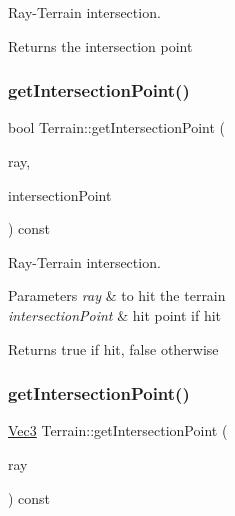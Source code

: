 Ray-\/\+Terrain intersection. \begin{DoxyReturn}{Returns}
the intersection point 
\end{DoxyReturn}
\mbox{\label{classTerrain_a1455fb66bddeae92b522ce4523ed42f7}} 
\subsubsection{\texorpdfstring{get\+Intersection\+Point()}{getIntersectionPoint()}\hspace{0.1cm}{\footnotesize\ttfamily [2/4]}}
{\footnotesize\ttfamily bool Terrain\+::get\+Intersection\+Point (\begin{DoxyParamCaption}\item[{const \hyperlink{classRay}{Ray} \&}]{ray,  }\item[{\hyperlink{classVec3}{Vec3} \&}]{intersection\+Point }\end{DoxyParamCaption}) const}

Ray-\/\+Terrain intersection. 
\begin{DoxyParams}{Parameters}
{\em ray} & to hit the terrain \\
\hline
{\em intersection\+Point} & hit point if hit \\
\hline
\end{DoxyParams}
\begin{DoxyReturn}{Returns}
true if hit, false otherwise 
\end{DoxyReturn}
\mbox{\label{classTerrain_ae2473c9297ec8ef1e14d227094d760bd}} 
\subsubsection{\texorpdfstring{get\+Intersection\+Point()}{getIntersectionPoint()}\hspace{0.1cm}{\footnotesize\ttfamily [3/4]}}
{\footnotesize\ttfamily \hyperlink{classVec3}{Vec3} Terrain\+::get\+Intersection\+Point (\begin{DoxyParamCaption}\item[{const \hyperlink{classRay}{Ray} \&}]{ray }\end{DoxyParamCaption}) const}


